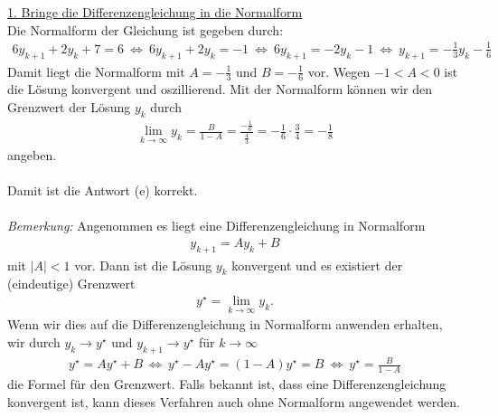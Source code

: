 \underline{1. Bringe die Differenzengleichung in die Normalform}\\
Die Normalform der Gleichung ist gegeben durch:
\begin{align*}
	6y_{k+1} + 2 y_k +7 = 6
	\ \Leftrightarrow \
	6y_{k+1} + 2 y_k  = -1
	\ \Leftrightarrow \
	6y_{k+1} = - 2 y_k   -1
	\ \Leftrightarrow \
	y_{k+1} = - \frac{1}{3} y_k   - \frac{1}{6}
\end{align*}
Damit liegt die Normalform mit $A = -\frac{1}{3}$ und $B = - \frac{1}{6}$ vor. Wegen $-1 < A  < 0 $ ist die Lösung konvergent und oszillierend. Mit der Normalform können wir den Grenzwert der Lösung $y_k$ durch 
\begin{align*}
	\lim \limits_{k \to \infty} y_k = \frac{B}{1 -A} = \frac{-\frac{1}{6}}{\frac{4}{3}}
	=
	- \frac{1}{6} \cdot \frac{3}{4} = -\frac{1}{8}
\end{align*}
angeben.\\
\\
Damit ist die Antwort (e) korrekt.\\
\\
\textit{Bemerkung:} Angenommen es liegt eine Differenzengleichung
in Normalform 
\begin{align*}
	y_{k+1} = A y_k + B
\end{align*}
mit $|A|<1$ vor. Dann ist die Lösung $y_k$ konvergent und es existiert der (eindeutige) Grenzwert
\begin{align*}
	y^\star = \lim \limits_{k \to \infty} y_k.
\end{align*}
Wenn wir dies auf die Differenzengleichung in Normalform anwenden erhalten, wir durch $y_k \to y^\star$ und $y_{k+1} \to y^\star$ für $k \to \infty$
\begin{align*}
	y^\star = A y^\star + B
	\ \Leftrightarrow \
	y^\star - A y^\star = (1 -A) y^\star = B
	\ \Leftrightarrow \
	y^\star = \frac{B}{1-A}
\end{align*}
die Formel für den Grenzwert. Falls bekannt ist, dass eine Differenzengleichung konvergent ist, kann dieses Verfahren auch ohne Normalform angewendet werden.